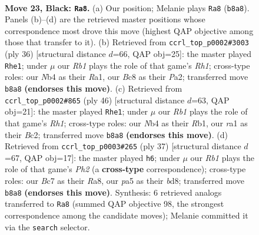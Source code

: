 \documentclass[11pt]{article}
\begin{document}
\clearpage

\begin{figure}[p]\centering
\begin{subfigure}{0.46\textwidth}\centering
\resizebox{\linewidth}{!}{%
\newchessgame
\chessboard[
  setfen={1rb4k/ppb3pp/5n2/P4p2/1n3P2/1P2P1P1/4B3/RNB2RK1 b - - 6 23},
  showmover=false,
  pgfstyle=straightmove, color=movearrow, markmove={b8-a8}
]}
\caption{}
\end{subfigure}\hfill
\begin{subfigure}{0.46\textwidth}\centering
\resizebox{\linewidth}{!}{%
\newchessgame
\chessboard[
  setfen={r3r1k1/1p1b1pp1/p2b4/3p2Pp/7P/2PBBP2/PP3K2/R6R w - - 1 19},
  showmover=false,
  pgfstyle=straightmove, color=movearrow, markmove={h1-e1}
]}
\caption{}
\end{subfigure}
\\[4pt]
\begin{subfigure}{0.46\textwidth}\centering
\resizebox{\linewidth}{!}{%
\newchessgame
\chessboard[
  setfen={r3r1k1/p4p1n/2pp2pp/8/P1bBP3/7P/2BK1PP1/1R5R w - - 1 24},
  showmover=false,
  pgfstyle=straightmove, color=movearrow, markmove={h1-e1}
]}
\caption{}
\end{subfigure}\hfill
\begin{subfigure}{0.46\textwidth}\centering
\resizebox{\linewidth}{!}{%
\newchessgame
\chessboard[
  setfen={r2B2k1/1p3ppp/2p5/5b2/p3n3/P6P/1PP1BPP1/3R2K1 b - - 0 19},
  showmover=false,
  pgfstyle=straightmove, color=movearrow, markmove={h7-h6}
]}
\caption{}
\end{subfigure}
\caption{\textbf{Move 23, Black: \texttt{Ra8}.} (a) Our position; Melanie plays \texttt{Ra8} (\texttt{b8a8}). Panels (b)--(d) are the retrieved master positions whose correspondence most drove this move (highest QAP objective among those that transfer to it). (b) Retrieved from \texttt{ccrl\_top\_p0002\#3003} (ply 36) [structural distance $d$=66, QAP obj=25]: the master played \texttt{Rhe1}; under $\mu$ our \emph{Rb1} plays the role of that game's \emph{Rh1}; cross-type roles: our \emph{N}b4 as their \emph{R}a1, our \emph{B}c8 as their \emph{P}a2; transferred move \texttt{b8a8} \textbf{(endorses this move)}. (c) Retrieved from \texttt{ccrl\_top\_p0002\#865} (ply 46) [structural distance $d$=63, QAP obj=21]: the master played \texttt{Rhe1}; under $\mu$ our \emph{Rb1} plays the role of that game's \emph{Rh1}; cross-type roles: our \emph{N}b4 as their \emph{R}b1, our \emph{r}a1 as their \emph{B}c2; transferred move \texttt{b8a8} \textbf{(endorses this move)}. (d) Retrieved from \texttt{ccrl\_top\_p0003\#265} (ply 37) [structural distance $d$=67, QAP obj=17]: the master played \texttt{h6}; under $\mu$ our \emph{Rb1} plays the role of that game's \emph{Ph2} (a \textbf{cross-type} correspondence); cross-type roles: our \emph{B}c7 as their \emph{R}a8, our \emph{p}a5 as their \emph{b}d8; transferred move \texttt{b8a8} \textbf{(endorses this move)}. Synthesis: 6 retrieved analogs transferred to \texttt{Ra8} (summed QAP objective 98, the strongest correspondence among the candidate moves); Melanie committed it via the \texttt{search} selector.}
\label{fig:thought-m45}
\end{figure}
\end{document}
